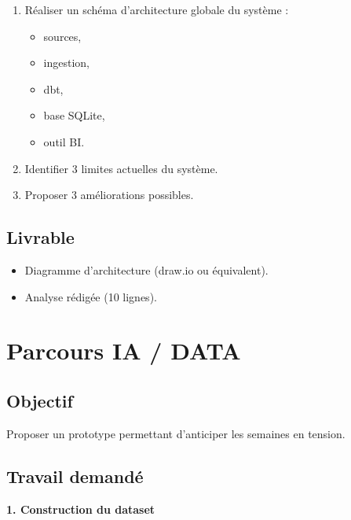\documentclass[11pt,a4paper]{article}
\begin{document}
\begin{enumerate}
  \item Réaliser un schéma d’architecture globale du système :
  \begin{itemize}
    \item sources,
    \item ingestion,
    \item dbt,
    \item base SQLite,
    \item outil BI.
  \end{itemize}
  \item Identifier 3 limites actuelles du système.
  \item Proposer 3 améliorations possibles.
\end{enumerate}

\subsection*{Livrable}

\begin{itemize}
  \item Diagramme d’architecture (draw.io ou équivalent).
  \item Analyse rédigée (10 lignes).
\end{itemize}

\section*{Parcours IA / DATA}

\subsection*{Objectif}

Proposer un prototype permettant d’anticiper les semaines en tension.

\subsection*{Travail demandé}

\textbf{1. Construction du dataset}
\end{document}
